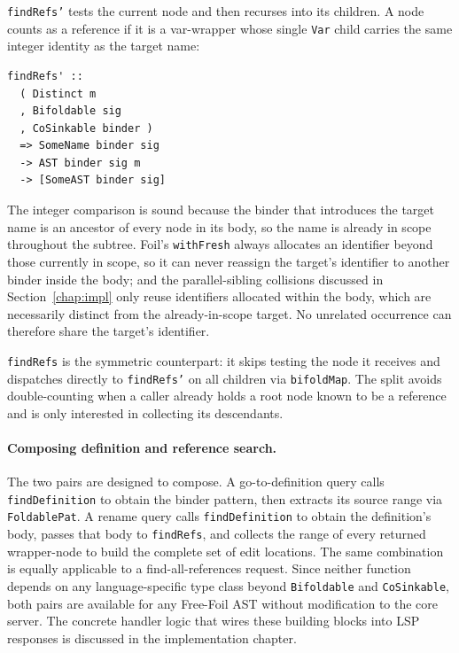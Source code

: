 \texttt{findRefs'} tests the current node and then recurses into its children.
A node counts as a reference if it is a var-wrapper whose single \texttt{Var} child carries the same integer identity as the target name:

\begin{verbatim}
findRefs' ::
  ( Distinct m
  , Bifoldable sig
  , CoSinkable binder )
  => SomeName binder sig
  -> AST binder sig m
  -> [SomeAST binder sig]
\end{verbatim}

The integer comparison is sound because the binder that introduces the target name is an ancestor of every node in its body, so the name is already in scope throughout the subtree.
Foil's \texttt{withFresh} always allocates an identifier beyond those currently in scope, so it can never reassign the target's identifier to another binder inside the body; and the parallel-sibling collisions discussed in Section~\ref{chap:impl} only reuse identifiers allocated within the body, which are necessarily distinct from the already-in-scope target.
No unrelated occurrence can therefore share the target's identifier.

\texttt{findRefs} is the symmetric counterpart: it skips testing the node it receives and dispatches directly to \texttt{findRefs'} on all children via \texttt{bifoldMap}.
The split avoids double-counting when a caller already holds a root node known to be a reference and is only interested in collecting its descendants.

\paragraph{Composing definition and reference search.}
The two pairs are designed to compose.
A go-to-definition query calls \texttt{findDefinition} to obtain the binder pattern, then extracts its source range via \texttt{FoldablePat}.
A rename query calls \texttt{findDefinition} to obtain the definition's body, passes that body to \texttt{findRefs}, and collects the range of every returned wrapper-node to build the complete set of edit locations.
The same combination is equally applicable to a find-all-references request.
Since neither function depends on any language-specific type class beyond \texttt{Bifoldable} and \texttt{CoSinkable}, both pairs are available for any Free-Foil AST without modification to the core server.
The concrete handler logic that wires these building blocks into LSP responses is discussed in the implementation chapter.

